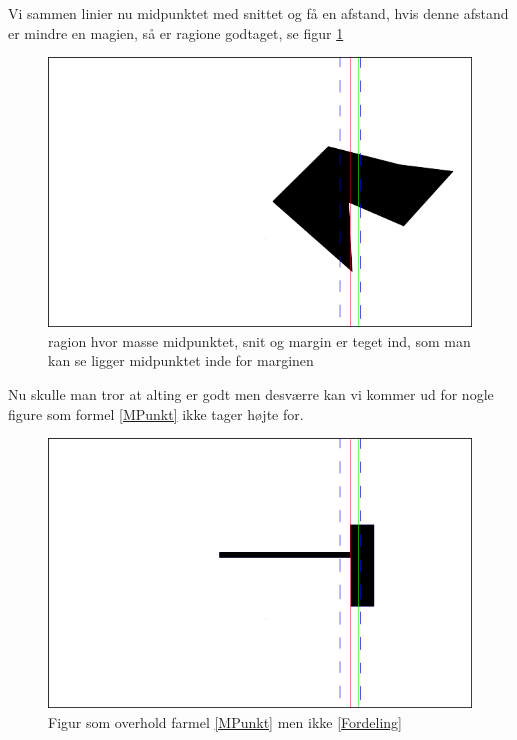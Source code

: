 {Vi sammen linier nu midpunktet med snittet og få en afstand, hvis denne
afstand er mindre en magien, så er ragione godtaget, se figur
\ref{cOMCutMargin}

\begin{figure}[h]
	\begin{center}
		\includegraphics[scale=0.5,angle=0]{afsnit/vores_implementation/billeder/udvidet_loesning/cOMCutMargin.png}
	\end{center}
	\caption[]{ragion hvor masse midpunktet, snit og margin er teget ind, som man kan se ligger midpunktet inde for marginen}
	\label{cOMCutMargin}
\end{figure}

Nu skulle man tror at alting er godt men desværre kan vi kommer ud for
nogle figure som formel \ref{MPunkt} ikke tager højte for.

\begin{figure}[h]
	\begin{center}
		\includegraphics[scale=0.5,angle=0]{afsnit/vores_implementation/billeder/udvidet_loesning/dontWork.png}
	\end{center}
	\caption[]{Figur som overhold farmel \ref{MPunkt} men ikke \ref{Fordeling}}
	\label{dontwork}
\end{figure}

}
